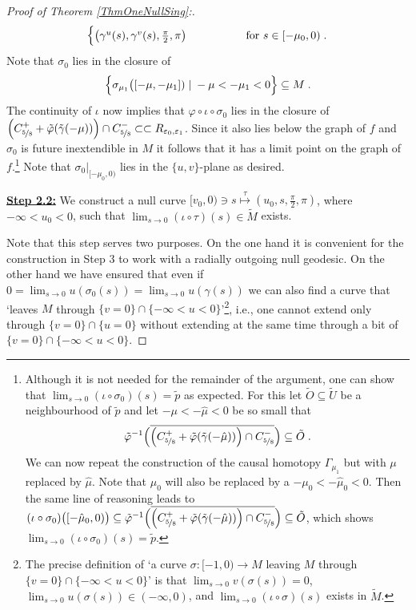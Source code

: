 \documentclass[reqno]{article}
\newcommand{\Reps}{R_{\varepsilon_0, \varepsilon_1}}
\begin{document}
\begin{proof}[Proof of Theorem \ref{ThmOneNullSing}:]
$$\begin{cases}
\big(\gamma^u(s), \gamma^v(s), \frac{\pi}{2}, \pi\big) \qquad \qquad &\textnormal{ for } s \in [-\mu_0, 0) \;. \end{cases}$$
Note that $\sigma_0$ lies in the closure of $$\Big{\{}\sigma_{\mu_1} \big( [ -\mu, -\mu_1]) \; | \; -\mu < -\mu_1 <0 \Big{\}} \subseteq M \;.$$ The continuity of $\iota$ now implies that $\varphi \circ \iota \circ \sigma_0$ lies in the closure of $\Big(C^+_{\nicefrac{5}{8}} + \tilde{\varphi}(\tilde{\gamma}(-\mu))\Big) \cap C^-_{\nicefrac{5}{8}} \subset \subset \Reps$. Since it also lies below the graph of $f$ and $\sigma_0$ is future inextendible in $M$ it follows that it has a limit point on the graph of $f$.\footnote{Although it is not needed for the remainder of the argument, one can show that $\lim_{s \to 0} (\iota \circ \sigma_0)(s) = \tilde{p}$ as expected. For this let $\tilde{O} \subseteq \tilde{U}$ be a neighbourhood of $\tilde{p}$ and let $-\mu < -\hat{\mu} <0$ be so small that $$ \tilde{\varphi}^{-1} \Big(\overline{ \Big(C^+_{\nicefrac{5}{8}} + \tilde{\varphi}(\tilde{\gamma}(-\hat{\mu}))\Big) \cap C^-_{\nicefrac{5}{8}}}\Big) \subseteq \tilde{O} \;.$$ We can now repeat the construction of the causal homotopy $\Gamma_{\mu_1}$ but with $\mu$ replaced by $\hat{\mu}$. Note that $\mu_0$ will also be replaced by a $-\mu_0 < -\hat{\mu}_0 < 0$. Then the same line of reasoning leads to $(\iota \circ \sigma_0) \big([-\hat{\mu}_0,0)\big) \subseteq \tilde{\varphi}^{-1}\Big(\overline{\Big(C^+_{\nicefrac{5}{8}} + \tilde{\varphi}(\tilde{\gamma}(-\hat{\mu}))\Big) \cap C^-_{\nicefrac{5}{8}}}\Big) \subseteq \tilde{O}$, which shows $\lim_{s \to 0} (\iota \circ \sigma_0)(s) = \tilde{p}$.} Note that $\sigma_0|_{[-\mu_0, 0)}$ lies in the $\{u,v\}$-plane as desired.
\newline

\textbf{\underline{Step 2.2:}} We construct a null curve $[v_0, 0)  \ni s \overset{\tau}{\mapsto} (u_0, s, \frac{\pi}{2}, \pi)$, where $-\infty < u_0 < 0$, such that $\lim_{s \to 0} (\iota \circ \tau)(s) \in \tilde{M}$ exists.

Note that this step serves two purposes. On the one hand it is convenient for the construction in Step 3 to work with a radially outgoing null geodesic. On the other hand we have ensured that even if $0 = \lim_{s \to 0} u(\sigma_0(s)) = \lim_{s \to 0} u(\gamma(s))$ we can also find a curve that `leaves $M$ through $\{v= 0\} \cap \{-\infty < u < 0\}$'\footnote{The precise definition of `a curve $\sigma : [-1,0) \to M$ leaving $M$ through $\{v = 0\} \cap \{-\infty < u < 0\}$' is that $\lim_{s \to 0} v(\sigma(s)) = 0$, $\lim_{s \to 0} u (\sigma(s)) \in (-\infty, 0)$, and $\lim_{s \to 0} (\iota \circ \sigma)(s)$ exists in $\tilde{M}$.}, i.e., one cannot extend only through $\{v = 0\} \cap \{ u =0\}$ without extending at the same time through a bit of $\{v = 0\} \cap \{-\infty < u < 0\}$.


\end{proof}
\end{document}
